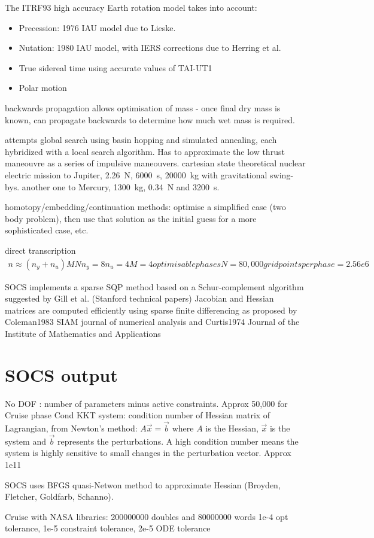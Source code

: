 The ITRF93 high accuracy Earth rotation model takes into account:
\begin{itemize}
\item Precession: 1976 IAU model due to Lieske.
\item  Nutation: 1980 IAU model, with IERS corrections due to Herring et al.
\item  True sidereal time using accurate values of TAI-UT1
\item  Polar motion
\end{itemize}



backwards propagation allows optimisation of mass - once final dry mass is known, can propagate backwards to determine how much wet mass is required.


\cite{Yam2011} attempts global search using basin hopping and simulated annealing, each hybridized with a local search algorithm. Has to approximate the low thrust maneouvre as a series of impulsive maneouvers.
cartesian state
theoretical nuclear electric mission to Jupiter, 2.26~N, 6000~s, 20000~kg with gravitational swing-bys.
another one to Mercury, 1300~kg, 0.34~N and 3200~s.


homotopy/embedding/continuation methods: optimise a simplified case (two body problem), then use that solution as the initial guess for a more sophisticated case, etc.


direct transcription
\begin{gather}
n \approx (n_y + n_u)MN
n_y = 8
n_u = 4
M = 4 optimisable phases
N = 80,000 grid points per phase
=2.56e6
\end{gather}
\cite{Betts1998}

SOCS implements a sparse SQP method based on a Schur-complement algorithm suggested by Gill et al. (Stanford technical papers)
Jacobian and Hessian matrices are computed efficiently using sparse finite differencing as proposed by Coleman1983 SIAM journal of numerical analysis and Curtis1974 Journal of the Institute of Mathematics and Applications

\section{SOCS output}
No DOF : number of parameters minus active constraints. Approx 50,000 for Cruise phase
Cond KKT system: condition number of Hessian matrix of Lagrangian, from Newton's method: $A\vec{x}=\vec{b}$ where $A$ is the Hessian, $\vec{x}$ is the system and $\vec{b}$ represents the perturbations. A high condition number means the system is highly sensitive to small changes in the perturbation vector. Approx 1e11

SOCS uses BFGS quasi-Netwon method to approximate Hessian (Broyden, Fletcher, Goldfarb, Schanno).

Cruise with NASA libraries: 200000000 doubles and 80000000 words
1e-4 opt tolerance, 1e-5 constraint tolerance, 2e-5 ODE tolerance
